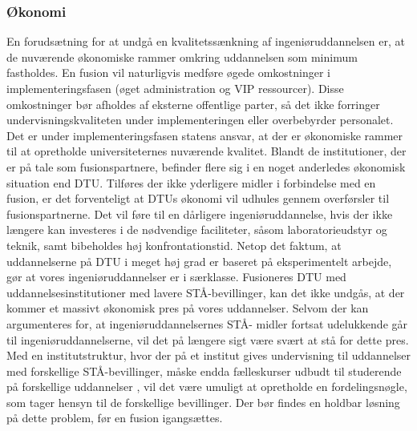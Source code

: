\subsubsection{Økonomi}
En forudsætning for at undgå en kvalitetssænkning af ingeniøruddannelsen er, at de nuværende økonomiske rammer
omkring uddannelsen som minimum fastholdes. En fusion vil naturligvis medføre øgede omkostninger i
implementeringsfasen (øget administration og VIP ressourcer). Disse omkostninger bør afholdes af eksterne offentlige
parter, så det ikke forringer undervisningskvaliteten under implementeringen eller overbebyrder personalet. Det er
under implementeringsfasen statens ansvar, at der er økonomiske rammer til at opretholde universiteternes nuværende
kvalitet.
Blandt de institutioner, der er på tale som fusionspartnere, befinder flere sig i en noget anderledes økonomisk situation
end DTU. Tilføres der ikke yderligere midler i forbindelse med en fusion, er det forventeligt at DTUs økonomi vil
udhules gennem overførsler til fusionspartnerne. Det vil føre til en dårligere ingeniøruddannelse, hvis der ikke længere
kan investeres i de nødvendige faciliteter, såsom laboratorieudstyr og teknik, samt bibeholdes høj konfrontationstid.
Netop det faktum, at uddannelserne på DTU i meget høj grad er baseret på eksperimentelt arbejde, gør at vores
ingeniøruddannelser er i særklasse.
Fusioneres DTU med uddannelsesinstitutioner med lavere STÅ-bevillinger, kan det ikke undgås, at der kommer et
massivt økonomisk pres på vores uddannelser. Selvom der kan argumenteres for, at ingeniøruddannelsernes STÅ-
midler fortsat udelukkende går til ingeniøruddannelserne, vil det på længere sigt være svært at stå for dette pres. Med en
institutstruktur, hvor der på et institut gives undervisning til uddannelser med forskellige STÅ-bevillinger, måske endda
fælleskurser udbudt til studerende på forskellige uddannelser , vil det være umuligt at opretholde en fordelingsnøgle,
som tager hensyn til de forskellige bevillinger. Der bør findes en holdbar løsning på dette problem, før en fusion
igangsættes.
